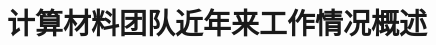 
\title{计算材料团队近年来工作情况概述}
\author[ ]{}   %
\renewcommand*{\Authfont}{\small\rm} %
\renewcommand*{\Affilfont}{\small\it} %
\renewcommand\Authands{ and } %
\renewcommand\Authands{ , } %
\date{} %



